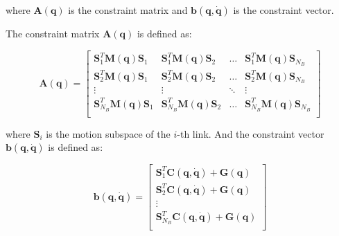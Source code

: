 where $\mathbf{A} (\mathbf{q})$ is the constraint matrix and $\mathbf{b} (\mathbf{q}, \dot{\mathbf{q}})$ is the constraint vector.

The constraint matrix $\mathbf{A} (\mathbf{q})$ is defined as:

\begin{equation}
    \mathbf{A} (\mathbf{q}) = \begin{bmatrix}
        \mathbf{S} _1 ^T \mathbf{M} (\mathbf{q}) \mathbf{S} _1     & \mathbf{S} _1 ^T \mathbf{M} (\mathbf{q}) \mathbf{S} _2     & \dots  & \mathbf{S} _1 ^T \mathbf{M} (\mathbf{q}) \mathbf{S} _{N_B}     \\
        \mathbf{S} _2 ^T \mathbf{M} (\mathbf{q}) \mathbf{S} _1     & \mathbf{S} _2 ^T \mathbf{M} (\mathbf{q}) \mathbf{S} _2     & \dots  & \mathbf{S} _2 ^T \mathbf{M} (\mathbf{q}) \mathbf{S} _{N_B}     \\
        \vdots                                                     & \vdots                                                     & \ddots & \vdots                                                         \\
        \mathbf{S} _{N_B} ^T \mathbf{M} (\mathbf{q}) \mathbf{S} _1 & \mathbf{S} _{N_B} ^T \mathbf{M} (\mathbf{q}) \mathbf{S} _2 & \dots  & \mathbf{S} _{N_B} ^T \mathbf{M} (\mathbf{q}) \mathbf{S} _{N_B} \\
    \end{bmatrix}
\end{equation}

where $\mathbf{S} _i$ is the motion subspace of the $i$-th link. And the constraint vector $\mathbf{b} (\mathbf{q}, \dot{\mathbf{q}})$ is defined as:

\begin{equation}
    \mathbf{b} (\mathbf{q}, \dot{\mathbf{q}}) = \begin{bmatrix}
        \mathbf{S} _1 ^T \mathbf{C} (\mathbf{q}, \dot{\mathbf{q}}) + \mathbf{G} (\mathbf{q})     \\
        \mathbf{S} _2 ^T \mathbf{C} (\mathbf{q}, \dot{\mathbf{q}}) + \mathbf{G} (\mathbf{q})     \\
        \vdots                                                                                   \\
        \mathbf{S} _{N_B} ^T \mathbf{C} (\mathbf{q}, \dot{\mathbf{q}}) + \mathbf{G} (\mathbf{q}) \\
    \end{bmatrix}
\end{equation}

